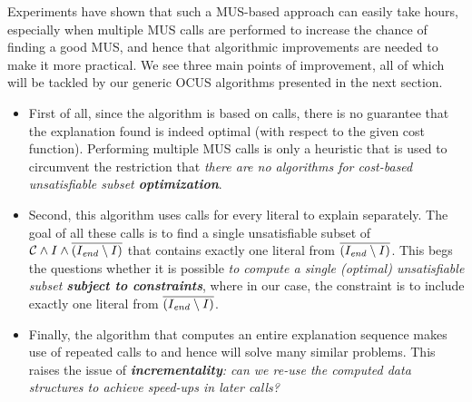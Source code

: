 Experiments have shown that such a MUS-based approach can easily take hours, especially when multiple MUS calls are performed to increase the chance of finding a good MUS, and hence that algorithmic improvements are needed to make it more practical. 
We see three main points of improvement, all of which will be tackled by our generic OCUS algorithms presented in the next section. 
\begin{itemize}
 \item First of all, since the algorithm is based on  calls, there is no guarantee that the explanation found is indeed optimal %
 (with respect to the given cost function). 
 Performing multiple MUS calls is only a heuristic that is used to circumvent the restriction that \textit{there are no algorithms for cost-based unsatisfiable subset \textbf{optimization}}. 
 \item Second, this algorithm uses  calls for every literal to explain separately. The goal of all these calls is to find a single unsatisfiable subset of $\mathcal{C}  \land I \land \overline{(I_\mathit{end} \setminus I)}$ that contains exactly one literal from $\overline{(I_\mathit{end} \setminus I)}$. This begs the questions whether it is possible \textit{to compute a single (optimal) unsatisfiable subset \textbf{subject to constraints}}, where in our case, the constraint is to include exactly one literal from $\overline{(I_\mathit{end} \setminus I)}$. 
 \item Finally, the algorithm that computes an entire explanation sequence makes use of repeated calls to \onestep and hence will solve many similar problems. This raises the issue of \textit{\textbf{incrementality}: can we re-use the computed data structures to achieve speed-ups in later calls?}
\end{itemize}





